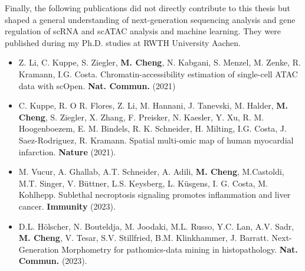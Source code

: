 Finally, the following publications did not directly contribute to this thesis but shaped a general understanding of next-generation sequencing analysis and gene regulation of scRNA and scATAC analysis and machine learning. They were published during my Ph.D. studies at RWTH University Aachen.

\begin{addmargin}{0.02\textwidth}
	\begin{itemize}
	\item Z. Li, C. Kuppe, S. Ziegler, \textbf{M. Cheng}, N. Kabgani, S. Menzel, M. Zenke, R. Kramann, I.G. Costa. Chromatin-accessibility estimation of single-cell ATAC data with scOpen. \textbf{Nat. Commun.} (2021)
	\end{itemize}
\end{addmargin}

\begin{addmargin}{0.02\textwidth}
	\begin{itemize}
	\item C. Kuppe, R. O R. Flores, Z. Li, M. Hannani, J. Tanevski, M. Halder, \textbf{M. Cheng}, S. Ziegler, X. Zhang, F. Preisker, N. Kaesler, Y. Xu, R. M. Hoogenboezem, E. M. Bindels, R. K. Schneider, H. Milting, I.G. Costa, J. Saez-Rodriguez, R. Kramann. Spatial multi-omic map of human myocardial infarction. \textbf{Nature} (2021).
    \end{itemize}
\end{addmargin}

\begin{addmargin}{0.02\textwidth}
	\begin{itemize}
	\item M. Vucur,  A. Ghallab, A.T. Schneider, A. Adili,  \textbf{M. Cheng},  M.Castoldi, M.T. Singer,  V. Büttner, L.S. Keysberg, L. Küsgens, I. G. Costa, M. Kohlhepp.  Sublethal necroptosis signaling promotes inflammation and liver cancer. \textbf{Immunity} (2023).
	\end{itemize}
\end{addmargin}

\begin{addmargin}{0.02\textwidth}
	\begin{itemize}
	\item  D.L. Hölscher, N. Bouteldja, M. Joodaki, M.L. Russo, Y.C. Lan, A.V. Sadr, \textbf{M. Cheng}, V. Tesar, S.V. Stillfried, B.M. Klinkhammer, J. Barratt. Next-Generation Morphometry for pathomics-data mining in histopathology. \textbf{Nat. Commun.} (2023).
	\end{itemize}
\end{addmargin}

